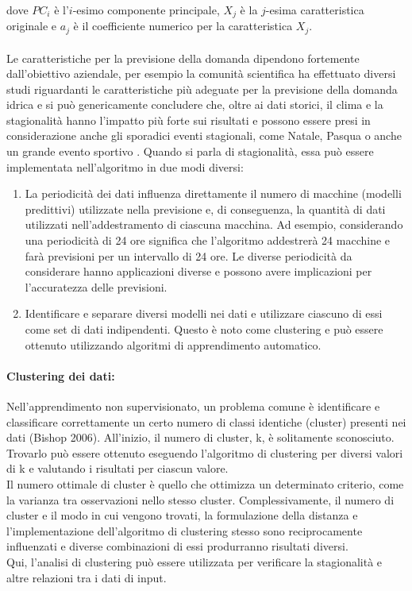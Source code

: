 \documentclass[12pt,a4paper]{report}
\begin{document}
dove $PC_i$ è l'$i$-esimo componente principale, $X_j$ è la $j$-esima caratteristica originale e $a_j$ è il coefficiente numerico per la caratteristica $X_j$.\\
\\
Le caratteristiche per la previsione della domanda dipendono fortemente dall'obiettivo aziendale, per esempio la comunità scientifica ha effettuato diversi studi riguardanti le caratteristiche più adeguate per la previsione della domanda idrica e si può genericamente concludere che, oltre ai dati storici, il clima e la stagionalità hanno l'impatto più forte sui risultati e possono essere presi in considerazione anche gli sporadici eventi stagionali, come Natale, Pasqua o anche un grande evento sportivo \cite{makridakis2018statistical}.
Quando si parla di stagionalità, essa può essere implementata nell'algoritmo in due modi diversi:
\begin{enumerate}
    \item La periodicità dei dati influenza direttamente il numero di macchine (modelli predittivi) utilizzate nella previsione e, di conseguenza, la quantità di dati utilizzati nell'addestramento di ciascuna macchina. Ad esempio, considerando una periodicità di 24 ore significa che l'algoritmo addestrerà 24 macchine e farà previsioni per un intervallo di 24 ore. Le diverse periodicità da considerare hanno applicazioni diverse e possono avere implicazioni per l'accuratezza delle previsioni.
    \item Identificare e separare diversi modelli nei dati e utilizzare ciascuno di essi come set di dati indipendenti. Questo è noto come clustering e può essere ottenuto utilizzando algoritmi di apprendimento automatico.
\end{enumerate}

\paragraph*{Clustering dei dati:}
Nell'apprendimento non supervisionato, un problema comune è identificare e classificare correttamente un certo numero di classi identiche (cluster) presenti nei dati (Bishop 2006). All'inizio, il numero di cluster, k, è solitamente sconosciuto. Trovarlo può essere ottenuto eseguendo l'algoritmo di clustering per diversi valori di k e valutando i risultati per ciascun valore.\\
Il numero ottimale di cluster è quello che ottimizza un determinato criterio, come la varianza tra osservazioni nello stesso cluster.
Complessivamente, il numero di cluster e il modo in cui vengono trovati, la formulazione della distanza e l'implementazione dell'algoritmo di clustering stesso sono reciprocamente influenzati e diverse combinazioni di essi produrranno risultati diversi.\\
Qui, l'analisi di clustering può essere utilizzata per verificare la stagionalità e altre relazioni tra i dati di input.\\
\\
\end{document}
